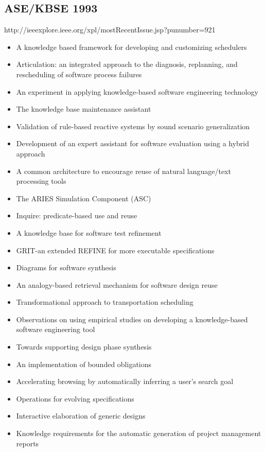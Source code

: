 \subsection{ASE/KBSE 1993}

http://ieeexplore.ieee.org/xpl/mostRecentIssue.jsp?punumber=921

{\small
\begin{itemize}[itemsep=-1ex]
  \item A knowledge based framework for developing and customizing schedulers
  \item Articulation: an integrated approach to the diagnosis, replanning, and rescheduling of software process failures
  \item An experiment in applying knowledge-based software engineering technology
  \item The knowledge base maintenance assistant
  \item Validation of rule-based reactive systems by sound scenario generalization
  \item Development of an expert assistant for software evaluation using a hybrid approach
  \item A common architecture to encourage reuse of natural language/text processing tools
  \item The ARIES Simulation Component (ASC)
  \item Inquire: predicate-based use and reuse
  \item A knowledge base for software test refinement
  \item GRIT-an extended REFINE for more executable specifications
  \item Diagrams for software synthesis
  \item An analogy-based retrieval mechanism for software design reuse
  \item Transformational approach to transportation scheduling
  \item Observations on using empirical studies on developing a knowledge-based software engineering tool
  \item Towards supporting design phase synthesis
  \item An implementation of bounded obligations
  \item Accelerating browsing by automatically inferring a user's search goal
  \item Operations for evolving specifications
  \item Interactive elaboration of generic designs
  \item Knowledge requirements for the automatic generation of project management reports
\end{itemize}
}

